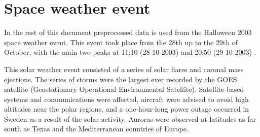 
\section{Space weather event}
In the rest of this document preprocessed data is used from the Halloween 2003 space weather event. This event took place from the 28th up to the 29th of October, with the main two peaks at 11:10 (28-10-2003) and 20:50 (29-10-2003) \cite{wiki_halloween_solar_stroms}.


This solar weather event consisted of a series of solar flares and coronal mass ejections. The series of storms were the largest ever recorded by the GOES satellite (Geostationary Operational Environmental Satellite). Satellite-based systems and communications were affected, aircraft were advised to avoid high altitudes near the polar regions, and a one-hour-long power outage occurred in Sweden as a result of the solar activity. Auroras were observed at latitudes as far south as Texas and the Mediterranean countries of Europe.






